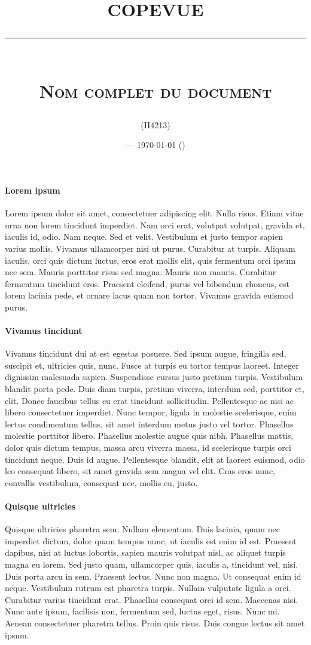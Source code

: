\documentclass[a4paper, 11pt, draft]{article}
\title{\textbf{COPEVUE}\\
\rule{\textwidth}{1pt}{}\\
\Huge{\textsc{Nom complet du document}}}
\author{\docauthor{} (H4213)}
\date{\docname{} --- \today{} (\docstatus{})}
\begin{document}
\maketitle

\paragraph{Lorem ipsum}
Lorem ipsum dolor sit amet, consectetuer adipiscing elit. Nulla risus. Etiam vitae urna non lorem tincidunt imperdiet. Nam orci erat, volutpat volutpat, gravida et, iaculis id, odio. Nam neque. Sed et velit. Vestibulum et justo tempor sapien varius mollis. Vivamus ullamcorper nisi ut purus. Curabitur at turpis. Aliquam iaculis, orci quis dictum luctus, eros erat mollis elit, quis fermentum orci ipsum nec sem. Mauris porttitor risus sed magna. Mauris non mauris. Curabitur fermentum tincidunt eros. Praesent eleifend, purus vel bibendum rhoncus, est lorem lacinia pede, et ornare lacus quam non tortor. Vivamus gravida euismod purus.

\paragraph{Vivamus tincidunt}
Vivamus tincidunt dui at est egestas posuere. Sed ipsum augue, fringilla sed, suscipit et, ultricies quis, nunc. Fusce at turpis eu tortor tempus laoreet. Integer dignissim malesuada sapien. Suspendisse cursus justo pretium turpis. Vestibulum blandit porta pede. Duis diam turpis, pretium viverra, interdum sed, porttitor et, elit. Donec faucibus tellus eu erat tincidunt sollicitudin. Pellentesque ac nisi ac libero consectetuer imperdiet. Nunc tempor, ligula in molestie scelerisque, enim lectus condimentum tellus, sit amet interdum metus justo vel tortor. Phasellus molestie porttitor libero. Phasellus molestie augue quis nibh. Phasellus mattis, dolor quis dictum tempus, massa arcu viverra massa, id scelerisque turpis orci tincidunt neque. Duis id augue. Pellentesque blandit, elit at laoreet euismod, odio leo consequat libero, sit amet gravida sem magna vel elit. Cras eros nunc, convallis vestibulum, consequat nec, mollis eu, justo.

\paragraph{Quisque ultricies}
Quisque ultricies pharetra sem. Nullam elementum. Duis lacinia, quam nec imperdiet dictum, dolor quam tempus nunc, ut iaculis est enim id est. Praesent dapibus, nisi at luctus lobortis, sapien mauris volutpat nisl, ac aliquet turpis magna eu lorem. Sed justo quam, ullamcorper quis, iaculis a, tincidunt vel, nisi. Duis porta arcu in sem. Praesent lectus. Nunc non magna. Ut consequat enim id neque. Vestibulum rutrum est pharetra turpis. Nullam vulputate ligula a orci. Curabitur varius tincidunt erat. Phasellus consequat orci id sem. Maecenas nisi. Nunc ante ipsum, facilisis non, fermentum sed, luctus eget, risus. Nunc mi. Aenean consectetuer pharetra tellus. Proin quis risus. Duis congue lectus sit amet ipsum.
\end{document}
